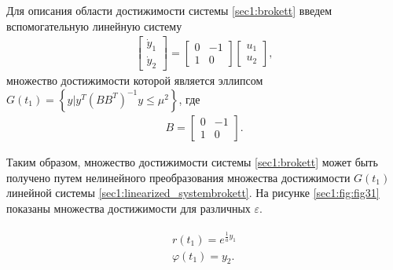 \documentclass[../main.tex]{subfiles}
\begin{document}
Для описания области достижимости системы \eqref{sec1:brokett} введем вспомогательную линейную систему
\begin{gather}\label{sec1:linearized_systembrokett}
     \left[ {\begin{array}{*{20}{c}}
             {{{\dot y}_1}}\\
             {{{\dot y}_2}}
     \end{array}} \right] = \left[ {\begin{array}{*{20}{c}}
             0&{ - 1}\\
             1&0
     \end{array}} \right]\left[ {\begin{array}{*{20}{c}}
             {{u_1}}\\
             {{u_2}}
     \end{array}} \right],
\end{gather}
множество достижимости которой является эллипсом $ G(t_1) = \left\lbrace y | y^T \left( B B^T\right)  ^{-1} y \leq \mu^2 \right\rbrace  $, где 
\begin{gather*}
     B = \left[ {\begin{array}{*{20}{c}}
             0&{ - 1}\\
             1&0
     \end{array}} \right].
\end{gather*}
 
Таким образом, множество достижимости системы \eqref{sec1:brokett} может быть получено путем нелинейного преобразования множества достижимости $ G(t_1) $ линейной системы \eqref{sec1:linearized_systembrokett}.
На рисунке  \ref{sec1:fig:fig31} показаны множества достижимости для различных $ \varepsilon $.
 
\begin{gather*}
\begin{array}{l}
         r({t_1}) = {e^{ \frac{1}{a} y_1}}\\
         \varphi ({t_1}) =  y_2. 
\end{array}
\end{gather*}
\end{document}
